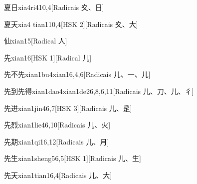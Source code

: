 \begin{entry}{夏日}{xia4ri4}{10,4}[Radicais ⼢、⽇]
\end{entry}

\begin{entry}{夏天}{xia4 tian1}{10,4}[HSK 2][Radicais ⼢、⼤]
\end{entry}

\begin{entry}{仙}{xian1}{5}[Radical ⼈]
\end{entry}

\begin{entry}{先}{xian1}{6}[HSK 1][Radical ⼉]
\end{entry}

\begin{entry}{先不先}{xian1bu4xian1}{6,4,6}[Radicais ⼉、⼀、⼉]
\end{entry}

\begin{entry}{先到先得}{xian1dao4xian1de2}{6,8,6,11}[Radicais ⼉、⼑、⼉、⼻]
\end{entry}

\begin{entry}{先进}{xian1jin4}{6,7}[HSK 3][Radicais ⼉、⾡]
\end{entry}

\begin{entry}{先烈}{xian1lie4}{6,10}[Radicais ⼉、⽕]
\end{entry}

\begin{entry}{先期}{xian1qi1}{6,12}[Radicais ⼉、⽉]
\end{entry}

\begin{entry}{先生}{xian1sheng5}{6,5}[HSK 1][Radicais ⼉、⽣]
\end{entry}

\begin{entry}{先天}{xian1tian1}{6,4}[Radicais ⼉、⼤]
\end{entry}

